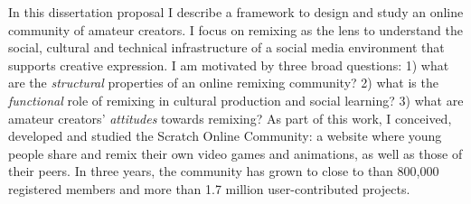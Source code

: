 


\setcounter{savepage}{\thepage}
\begin{abstractpage}
\setlength{\parskip}{0pt} %
\begin{spacing}{1}
In this dissertation proposal I describe a framework to design and study an online community of amateur creators.
I focus on remixing as the lens to understand the social, cultural and technical infrastructure of a social media environment that supports creative expression.
I am motivated by three broad questions:
1) what are the \emph{structural} properties of an online remixing community?
2) what is the \emph{functional} role of remixing in cultural production and social learning?
3) what are amateur creators' \emph{attitudes} towards remixing?
As part of this work, I conceived, developed and studied the Scratch Online Community: a website where young people share and remix their own video games and animations, as well as those of their peers.
In three years, the community has grown to close to than 800,000 registered members and more than 1.7 million user-contributed projects.
\end{spacing}
\setlength{\parskip}{11pt plus3pt minus3pt} %
\end{abstractpage}

